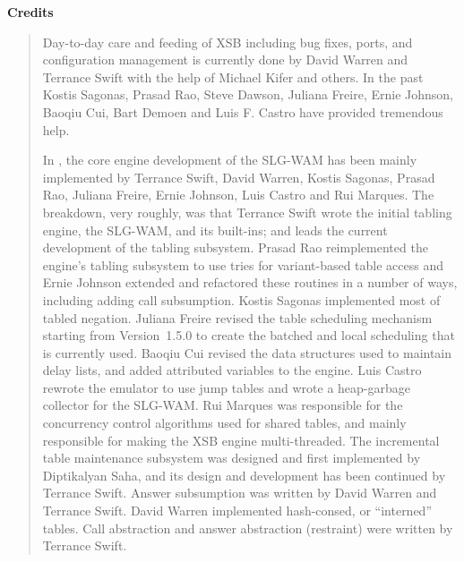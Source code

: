 \begin{center}
{\bf {\Large 
		Credits
}}
\end{center}


\begin{quote}
Day-to-day care and feeding of XSB including bug fixes, ports, and
configuration management is currently done by David Warren and
Terrance Swift with the help of Michael Kifer and others.  In the past
Kostis Sagonas, Prasad Rao, Steve Dawson, Juliana Freire, Ernie
Johnson, Baoqiu Cui, Bart Demoen and Luis F.  Castro have provided
tremendous help.

In \version, the core engine development of the SLG-WAM has been
mainly implemented by Terrance Swift, David Warren, Kostis Sagonas,
Prasad Rao, Juliana Freire, Ernie Johnson, Luis Castro and Rui
Marques.  The breakdown, very roughly, was that Terrance Swift wrote
the initial tabling engine, the SLG-WAM, and its built-ins; and leads
the current development of the tabling subsystem.  Prasad Rao
reimplemented the engine's tabling subsystem to use tries for
variant-based table access and Ernie Johnson extended and refactored
these routines in a number of ways, including adding call subsumption.
Kostis Sagonas implemented most of tabled negation.  Juliana Freire
revised the table scheduling mechanism starting from Version~1.5.0 to
create the batched and local scheduling that is currently used.
Baoqiu Cui revised the data structures used to maintain delay lists,
and added attributed variables to the engine.  Luis Castro rewrote the
emulator to use jump tables and wrote a heap-garbage collector for the
SLG-WAM.  Rui Marques was responsible for the concurrency control
algorithms used for shared tables, and mainly responsible for making
the XSB engine multi-threaded.  The incremental table maintenance
subsystem was designed and first implemented by Diptikalyan Saha, and
its design and development has been continued by Terrance Swift.
Answer subsumption was written by David Warren and Terrance Swift.
David Warren implemented hash-consed, or ``interned'' tables.  Call
abstraction and answer abstraction (restraint) were written by
Terrance Swift.


\end{quote}
